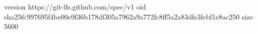 version https://git-lfs.github.com/spec/v1
oid sha256:997695f4be00e9f36b178df305a7962a9a772fc8ff5a2a83dfe3febf1e8ac250
size 5600
